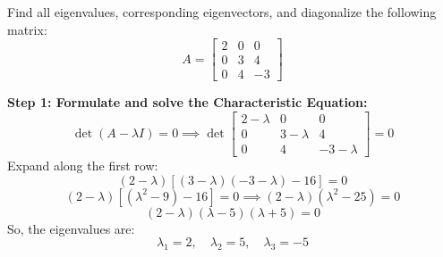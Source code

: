 \documentclass[11pt,a4paper]{article}
\begin{document}
\vspace{0.8cm}

\begin{questionbox}
Find all eigenvalues, corresponding eigenvectors, and diagonalize the following matrix:
\[ A = \begin{bmatrix} 2 & 0 & 0 \\ 0 & 3 & 4 \\ 0 & 4 & -3 \end{bmatrix} \]
\end{questionbox}

\begin{solutionbox}
\textbf{Step 1: Formulate and solve the Characteristic Equation:}
\[ \det(A - \lambda I) = 0 \implies \det\begin{bmatrix} 2-\lambda & 0 & 0 \\ 0 & 3-\lambda & 4 \\ 0 & 4 & -3-\lambda \end{bmatrix} = 0 \]
Expand along the first row:
\[ (2 - \lambda) \left[ (3 - \lambda)(-3 - \lambda) - 16 \right] = 0 \]
\[ (2 - \lambda) \left[ (\lambda^2 - 9) - 16 \right] = 0 \implies (2 - \lambda)(\lambda^2 - 25) = 0 \]
\[ (2 - \lambda)(\lambda - 5)(\lambda + 5) = 0 \]
So, the eigenvalues are:
\[ \lambda_1 = 2, \quad \lambda_2 = 5, \quad \lambda_3 = -5 \]


\end{solutionbox}
\end{document}
